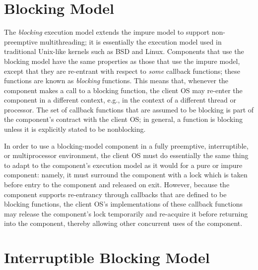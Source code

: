 \section{Blocking Model}

The \emph{blocking} execution model
extends the impure model to support non-preemptive multithreading;
it is essentially the execution model used
in traditional Unix-like kernels such as BSD and Linux.
Components that use the blocking model
have the same properties as those that use the impure model,
except that they are re-entrant
with respect to \emph{some} callback functions;
these functions are known as \emph{blocking} functions.
This means that,
whenever the component makes a call to a blocking function,
the client OS may re-enter the component in a different context,
e.g., in the context of a different thread or processor.
The set of callback functions that are assumed to be blocking
is part of the component's contract with the client OS;
in general, a function is blocking
unless it is explicitly stated to be nonblocking.

In order to use a blocking-model component
in a fully preemptive, interruptible, or multiprocessor environment,
the client OS must do essentially the same thing
to adapt to the component's execution model
as it would for a pure or impure component:
namely, it must surround the component with a lock
which is taken before entry to the component and released on exit.
However, because the component supports re-entrancy
through callbacks that are defined to be blocking functions,
the client OS's implementations of these callback functions
may release the component's lock temporarily
and re-acquire it before returning into the component,
thereby allowing other concurrent uses of the component.


\section{Interruptible Blocking Model}
\label{intr-blocking-model}

